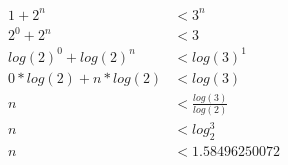 \begin{question}
   \begin{equation}
	  \begin{split}
	  		1 + 2^{n} &< 3^{n} \\
			2^{0} + 2^{n} &< 3 \\
			log(2)^{0} + log(2)^{n} &< log(3)^{1} \\
			0*log(2) + n*log(2) &< log(3) \\
			n &< \frac{log(3)}{log(2)} \\
			n &< log_{2}^{3} \\
			n &< 1.58496250072
		\end{split}
	\end{equation}
\end{question}